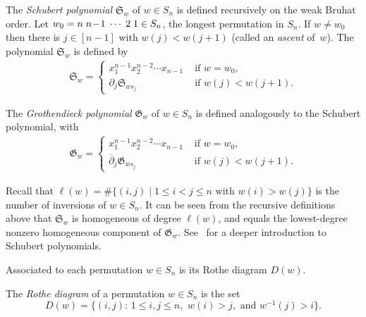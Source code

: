 \documentclass[ALCO]{cedram}
\begin{document}
\begin{definition}
	The \emph{Schubert polynomial} $\mathfrak{S}_w$ of $w\in S_n$ is defined recursively on the weak Bruhat order. Let $w_0=n \hspace{.1cm} n\!-\!1 \hspace{.1cm} \cdots \hspace{.1cm} 2 \hspace{.1cm} 1 \in S_n$, the longest permutation in $S_n$. If $w\neq w_0$ then there is $j\in [n-1]$ with $w(j)<w(j+1)$ (called an \emph{ascent} of~$w$). The polynomial $\mathfrak{S}_w$ is defined by
	\begin{align*}
		\mathfrak{S}_w=\begin{cases}
			x_1^{n-1}x_2^{n-2}\cdots x_{n-1}&\mbox{ if } w=w_0,\\
			\partial_j \mathfrak{S}_{ws_j} &\mbox{ if } w(j)<w(j+1).
		\end{cases}
	\end{align*}
\end{definition}

\begin{definition}
	The \emph{Grothendieck polynomial} $\mathfrak{G}_w$ of $w\in S_n$ is defined analogously to the Schubert polynomial,
	with
	\begin{align*}
		\mathfrak{G}_w=\begin{cases}
			x_1^{n-1}x_2^{n-2}\cdots x_{n-1}&\mbox{ if } w=w_0,\\
			\overline{\partial}_j \mathfrak{G}_{ws_j} &\mbox{ if } w(j)<w(j+1).
		\end{cases}
	\end{align*}	
\end{definition}

Recall that $\ell(w)=\#\{(i,j)\mid 1\leq i<j\leq n \mbox{ with } w(i)>w(j) \}$ is the number of inversions of $w\in S_n$. It can be seen from the recursive definitions above that $\mathfrak{S}_w$ is homogeneous of degree $\ell(w)$, and equals the lowest-degree nonzero homogeneous component of $\mathfrak{G}_w$. See~\cite{manivel} for a deeper introduction to Schubert polynomials. 

Associated to each permutation $w\in S_n$ is its Rothe diagram $D(w)$.

\begin{definition}
	The \emph{Rothe diagram} of a permutation $w\in S_n$ is the set
	\[D(w)=\{(i,j):\, 1\leq i,j\leq n,\,\, w(i)>j,\,\, \mbox{and } w^{-1}(j)>i \}.\]
\end{definition}
\end{document}
